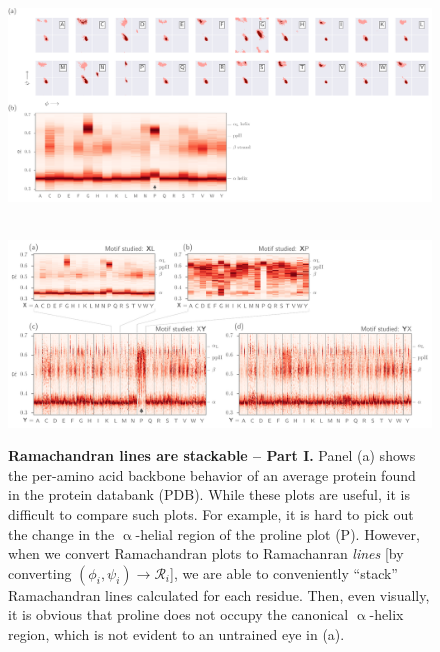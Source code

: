 \documentclass[fleqn,10pt,lineno]{wlpeerj} %
\begin{document}
\begin{figure}
\begin{adjustwidth}{-1in}{0in} %
\centering
\includegraphics[width=1.00\linewidth]{automated_figures/fig_ramachandran_plots_vs_numbers.pdf}
\caption{\textbf{Ramachandran lines are stackable -- Part I.}  
Panel (a) shows the per-amino acid backbone behavior of an average protein found in the protein databank (PDB). While these plots are useful, it is difficult to compare such plots. For example, it is hard to pick out the change in the $\upalpha$-helial region of the proline plot (P). However, when we convert Ramachandran plots to Ramachanran \textit{lines} [by converting $(\phi_i,\psi_i)\to\mathcal{R}_i$], we are able to conveniently ``stack'' Ramachandran lines calculated for each residue. Then, even visually, it is obvious that proline does not occupy the canonical $\upalpha$-helix region, which is not evident to an untrained eye in (a).\label{fig:peraa}}
~\vfill~
\includegraphics[width=1.00\linewidth]{automated_figures/fig_ramachandran_numbers_are_useful1.pdf}

\end{adjustwidth}
\end{figure}
\end{document}
